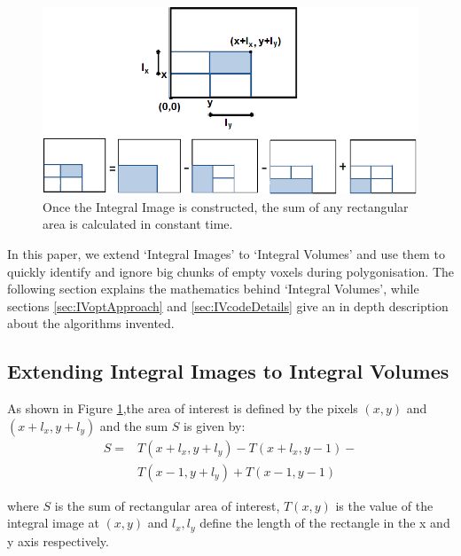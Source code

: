 \documentclass{subfiles}
\begin{document}
\begin{figure}[!htbp]
	\centering
	\includegraphics[width=5.5in]{img/IntegralImages}
	\caption[Integral Image]{Once the Integral Image is constructed, the sum of any rectangular area is calculated in constant time.}
	\label{fig:IntegralImages}
\end{figure}


In this paper, we extend `Integral Images' to `Integral Volumes' and use them to quickly identify and ignore big chunks of empty voxels during polygonisation. The following section explains the mathematics behind `Integral Volumes', while sections \ref{sec:IVoptApproach}  and \ref{sec:IVcodeDetails} give an in depth description about the algorithms invented. 

\subsection{Extending Integral Images to Integral Volumes}\label{sec:extendingIV}

As shown in Figure \ref{fig:IntegralImages},the area of interest is defined by the pixels $(x, y)$ and $(x+l_x, y+l_y)$ and the sum $S$ is given by: 
\begin{equation}
\begin{split}
S = & T(x+l_x,y+l_y) - 
T(x+l_x,y-1)- \\
&  T(x-1,y+l_y) +
T(x-1,y-1)
\end{split}
\label{eq:IntegralImage}
\end{equation}

where 	$S$ is the sum of rectangular area of interest, $T(x, y)$ is the value of the integral image at $(x, y)$ and $l_x, l_y$ define the length of the rectangle in the x and y axis respectively. 
\end{document}
